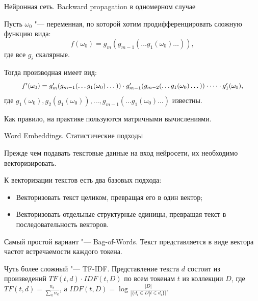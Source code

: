 \documentclass[notheorems, handout, 10pt]{beamer}
\begin{document}
	\begin{frame}{Нейронная сеть. Backward propagation в одномерном случае}
		
		Пусть $\omega_0$ "--- переменная, по которой хотим продифференцировать сложную функцию вида: $$f(\omega_0)=g_m(g_{m-1}(\dots g_1(\omega_0)\dots)),$$ где все $g_i$ скалярные.
		
		\vspace{0.2cm}
		
		Тогда производная имеет вид: $$\resizebox{0.9\textwidth}{0.9\height}{$f'(\omega_0)=g'_m(g_{m-1}(\dots g_1(\omega_0)\dots))\cdot g'_{m-1}(g_{m-2}(\dots g_1(\omega_0)\dots))\cdot\dots\cdot g'_1(\omega_0),$}$$ где $g_1(\omega_0), g_2(g_1(\omega_0)), \dots, g_{m-1}(\dots g_1(\omega_0)\dots)$ известны.
		
		\vspace{0.2cm}

		Как правило, на практике пользуются матричными вычислениями.
		
		\note{
			
		}
		
	\end{frame}
	
	\begin{frame}{Word Embeddings. Статистические подходы}
		
		Прежде чем подавать текстовые данные на вход нейросети, их необходимо векторизировать. 
		
		\vspace{0.2cm}
		
		К векторизации текстов есть два базовых подхода:

		\begin{itemize}
			\item Векторизовать текст целиком, превращая его в один вектор;
			\item Векторизовать отдельные структурные единицы, превращая текст в последовательность векторов.
		\end{itemize}
		
		Самый простой вариант "--- Bag-of-Words. Текст представляется в виде вектора частот встречаемости каждого токена.
		
		\vspace{0.2cm}
		
		Чуть более сложный "--- TF-IDF. Представление текста $d$ состоит из произведений $TF(t, d)\cdot IDF(t, D)$ по всем токенам $t$ из коллекции $D$, где $TF(t, d)=\frac{n_t}{\sum_k^{}n_k}$, а $IDF(t, D)=\log\frac{|D|}{|\{d_i\in D | t\in d_i\}|}$.
		
		\note{
			
		}
		
	\end{frame}
	
\end{document}
